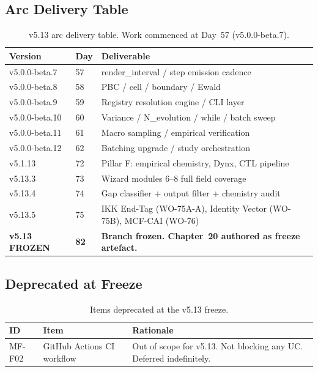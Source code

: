 \documentclass[11pt,a4paper]{article}
\theoremstyle{definition}
\begin{document}
\subsection{Arc Delivery Table}

\begin{table}[H]
\centering\small
\begin{tabular}{@{}lll@{}}
\toprule
Version & Day & Deliverable \\
\midrule
v5.0.0-beta.7  & 57 & render\_interval / step emission cadence \\
v5.0.0-beta.8  & 58 & PBC / cell / boundary / Ewald \\
v5.0.0-beta.9  & 59 & Registry resolution engine / CLI layer \\
v5.0.0-beta.10 & 60 & Variance / N\_evolution / while / batch sweep \\
v5.0.0-beta.11 & 61 & Macro sampling / empirical verification \\
v5.0.0-beta.12 & 62 & Batching upgrade / study orchestration \\
v5.1.13        & 72 & Pillar F: empirical chemistry, Dynx, CTL pipeline \\
v5.13.3        & 73 & Wizard modules 6--8 full field coverage \\
v5.13.4        & 74 & Gap classifier + output filter + chemistry audit \\
v5.13.5        & 75 & IKK End-Tag (WO-75A-A), Identity Vector (WO-75B), MCF-CAI (WO-76) \\
\midrule
\textbf{v5.13 FROZEN} & \textbf{82}
  & \textbf{Branch frozen. Chapter~20 authored as freeze artefact.} \\
\bottomrule
\end{tabular}
\caption{v5.13 arc delivery table. Work commenced at Day~57 (v5.0.0-beta.7).}
\end{table}

\subsection{Deprecated at Freeze}

\begin{table}[H]
\centering\small
\begin{tabular}{@{}lll@{}}
\toprule
ID & Item & Rationale \\
\midrule
MF-F02
  & GitHub Actions CI workflow
  & Out of scope for v5.13. Not blocking any UC\@. Deferred indefinitely. \\
\bottomrule
\end{tabular}
\caption{Items deprecated at the v5.13 freeze.}
\end{table}
\end{document}
